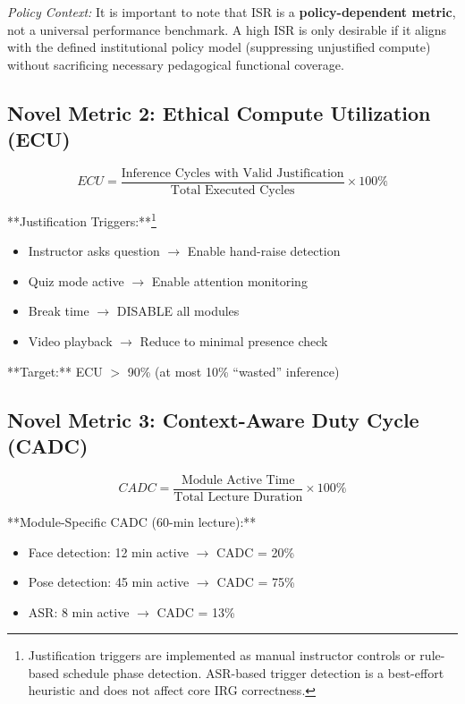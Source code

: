 \documentclass[conference]{IEEEtran}
\begin{document}
\textit{Policy Context:} It is important to note that ISR is a \textbf{policy-dependent metric}, not a universal performance benchmark. A high ISR is only desirable if it aligns with the defined institutional policy model (suppressing unjustified compute) without sacrificing necessary pedagogical functional coverage.

\subsection{Novel Metric 2: Ethical Compute Utilization (ECU)}
\begin{equation}
ECU = \frac{\text{Inference Cycles with Valid Justification}}{\text{Total Executed Cycles}} \times 100\%
\end{equation}

**Justification Triggers:**\footnote{Justification triggers are implemented as manual instructor controls or rule-based schedule phase detection. ASR-based trigger detection is a best-effort heuristic and does not affect core IRG correctness.}
\begin{itemize}
    \item Instructor asks question $\to$ Enable hand-raise detection
    \item Quiz mode active $\to$ Enable attention monitoring
    \item Break time $\to$ DISABLE all modules
    \item Video playback $\to$ Reduce to minimal presence check
\end{itemize}

**Target:** ECU $>$ 90\% (at most 10\% ``wasted'' inference)

\subsection{Novel Metric 3: Context-Aware Duty Cycle (CADC)}
\begin{equation}
CADC = \frac{\text{Module Active Time}}{\text{Total Lecture Duration}} \times 100\%
\end{equation}

**Module-Specific CADC (60-min lecture):**
\begin{itemize}
    \item Face detection: 12 min active $\to$ CADC = 20\%
    \item Pose detection: 45 min active $\to$ CADC = 75\%
    \item ASR: 8 min active $\to$ CADC = 13\%
\end{itemize}
\end{document}

